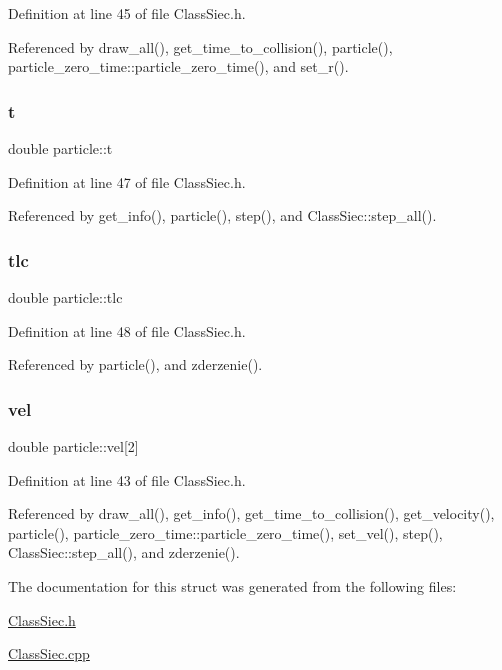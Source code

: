 Definition at line 45 of file Class\+Siec.\+h.



Referenced by draw\+\_\+all(), get\+\_\+time\+\_\+to\+\_\+collision(), particle(), particle\+\_\+zero\+\_\+time\+::particle\+\_\+zero\+\_\+time(), and set\+\_\+r().

\mbox{\label{structparticle_a5225483b35b28edcf29be553a367a952}} 
\subsubsection{\texorpdfstring{t}{t}}
{\footnotesize\ttfamily double particle\+::t}



Definition at line 47 of file Class\+Siec.\+h.



Referenced by get\+\_\+info(), particle(), step(), and Class\+Siec\+::step\+\_\+all().

\mbox{\label{structparticle_a5ab99949ec29f5623413672b923ffa25}} 
\subsubsection{\texorpdfstring{tlc}{tlc}}
{\footnotesize\ttfamily double particle\+::tlc}



Definition at line 48 of file Class\+Siec.\+h.



Referenced by particle(), and zderzenie().

\mbox{\label{structparticle_abd12470a54dcbf5694c6adeb8c06ef8b}} 
\subsubsection{\texorpdfstring{vel}{vel}}
{\footnotesize\ttfamily double particle\+::vel\mbox{[}2\mbox{]}}



Definition at line 43 of file Class\+Siec.\+h.



Referenced by draw\+\_\+all(), get\+\_\+info(), get\+\_\+time\+\_\+to\+\_\+collision(), get\+\_\+velocity(), particle(), particle\+\_\+zero\+\_\+time\+::particle\+\_\+zero\+\_\+time(), set\+\_\+vel(), step(), Class\+Siec\+::step\+\_\+all(), and zderzenie().



The documentation for this struct was generated from the following files\+:\begin{DoxyCompactItemize}
\item 
\mbox{\hyperlink{ClassSiec_8h}{Class\+Siec.\+h}}\item 
\mbox{\hyperlink{ClassSiec_8cpp}{Class\+Siec.\+cpp}}\end{DoxyCompactItemize}
